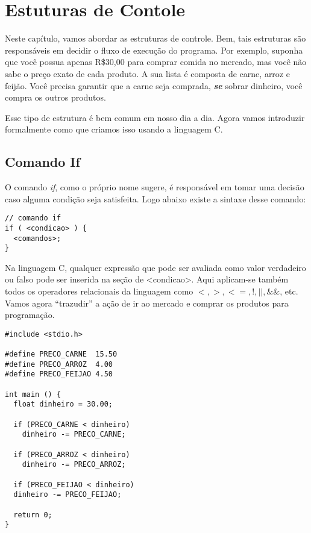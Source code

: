 
\chapter{Estuturas de Contole}
Neste capítulo, vamos abordar as estruturas de controle. Bem, tais estruturas são responsáveis em decidir o fluxo de execução do programa. Por exemplo, suponha que você possua apenas R\$30,00 para comprar comida no mercado, mas você não sabe o preço exato de cada produto. A sua lista é composta de carne, arroz e feijão. Você precisa garantir que a carne seja comprada, \emph{\textbf{se}} sobrar dinheiro, você compra os outros produtos.

Esse tipo de estrutura é bem comum em nosso dia a dia. Agora vamos introduzir formalmente como que criamos isso usando a linguagem C.

\section{Comando If}
O comando \textit{if}, como o próprio nome sugere, é responsável em tomar uma decisão caso alguma condição seja satisfeita. Logo abaixo existe a sintaxe desse comando:


\begin{lstlisting}[label=comandoIf,caption=Comando if]
// comando if
if ( <condicao> ) {
  <comandos>;
}
\end{lstlisting}

Na linguagem C, qualquer expressão que pode ser avaliada como valor verdadeiro ou falso pode ser inserida na seção de <condicao>. Aqui aplicam-se também todos os operadores relacionais da linguagem como $<, >, <=, !, ||,  \&\&$, etc.
Vamos agora ``trazudir'' a ação de ir ao mercado e comprar os produtos para programação.


\begin{lstlisting}[label=comandoIf,caption=Comando if]
#include <stdio.h>

#define PRECO_CARNE  15.50
#define PRECO_ARROZ  4.00
#define PRECO_FEIJAO 4.50

int main () {
  float dinheiro = 30.00;
  
  if (PRECO_CARNE < dinheiro)
    dinheiro -= PRECO_CARNE;
  
  if (PRECO_ARROZ < dinheiro)
    dinheiro -= PRECO_ARROZ;
  
  if (PRECO_FEIJAO < dinheiro)
  dinheiro -= PRECO_FEIJAO;    
  
  return 0;
}
\end{lstlisting}

